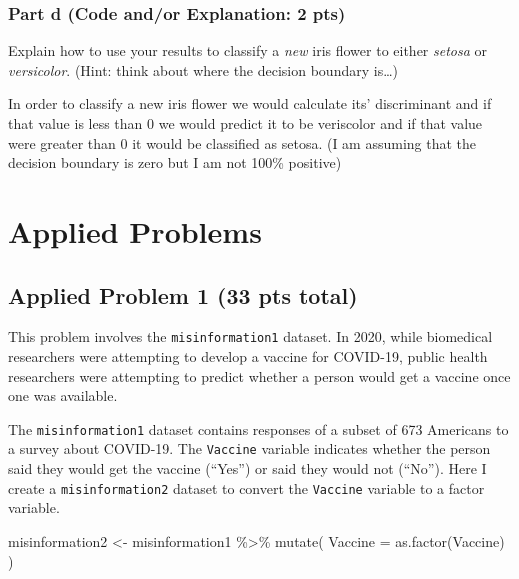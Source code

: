 \documentclass[
]{article}
\newenvironment{Shaded}{\begin{snugshade}}{\end{snugshade}}
\newcommand{\AttributeTok}[1]{\textcolor[rgb]{0.77,0.63,0.00}{#1}}
\newcommand{\FunctionTok}[1]{\textcolor[rgb]{0.00,0.00,0.00}{#1}}
\newcommand{\NormalTok}[1]{#1}
\newcommand{\OtherTok}[1]{\textcolor[rgb]{0.56,0.35,0.01}{#1}}
\newcommand{\SpecialCharTok}[1]{\textcolor[rgb]{0.00,0.00,0.00}{#1}}
\begin{document}
\hypertarget{part-d-code-andor-explanation-2-pts}{%
\subsubsection{Part d (Code and/or Explanation: 2
pts)}\label{part-d-code-andor-explanation-2-pts}}

Explain how to use your results to classify a \emph{new} iris flower to
either \emph{setosa} or \emph{versicolor}. (Hint: think about where the
decision boundary is\ldots)

In order to classify a new iris flower we would calculate its'
discriminant and if that value is less than 0 we would predict it to be
veriscolor and if that value were greater than 0 it would be classified
as setosa. (I am assuming that the decision boundary is zero but I am
not 100\% positive)

\hypertarget{applied-problems}{%
\section{Applied Problems}\label{applied-problems}}

\hypertarget{applied-problem-1-33-pts-total}{%
\subsection{Applied Problem 1 (33 pts
total)}\label{applied-problem-1-33-pts-total}}

This problem involves the \texttt{misinformation1} dataset. In 2020,
while biomedical researchers were attempting to develop a vaccine for
COVID-19, public health researchers were attempting to predict whether a
person would get a vaccine once one was available.

The \texttt{misinformation1} dataset contains responses of a subset of
673 Americans to a survey about COVID-19. The \texttt{Vaccine} variable
indicates whether the person said they would get the vaccine (``Yes'')
or said they would not (``No''). Here I create a
\texttt{misinformation2} dataset to convert the \texttt{Vaccine}
variable to a factor variable.

\begin{Shaded}
\begin{Highlighting}[]
\NormalTok{misinformation2 }\OtherTok{\textless{}{-}}\NormalTok{ misinformation1 }\SpecialCharTok{\%\textgreater{}\%} \FunctionTok{mutate}\NormalTok{(}
  \AttributeTok{Vaccine =} \FunctionTok{as.factor}\NormalTok{(Vaccine)}
\NormalTok{)}
\end{Highlighting}
\end{Shaded}
\end{document}
